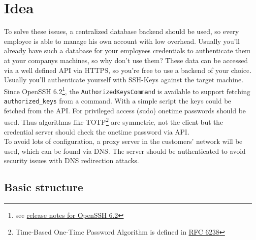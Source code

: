 %
%
%
%
%
%
%


\section{Idea}

To solve these issues, a centralized database backend should be used, so every
employee is able to manage his own account with low overhead. Usually you'll
already have such a database for your employees credentials to authenticate them
at your companys machines, so why don't use them? These data can be accessed via
a well defined API via HTTPS, so you're free to use a backend of your choice. \\

Usually you'll authenticate yourself with SSH-Keys against the target machine.
Since OpenSSH 6.2\footnote{see
\href{http://www.openssh.com/txt/release-6.2}{release notes for OpenSSH 6.2}},
the \verb+AuthorizedKeysCommand+ is available to support fetching
\verb+authorized_keys+ from a command. With a simple script the keys could be
fetched from the API. For privileged access (sudo) onetime passwords should be
used. Thus algorithms like TOTP\footnote{Time-Based One-Time Password Algorithm
is defined in \href{https://tools.ietf.org/html/rfc6238}{RFC 6238}} are
symmetric, not the client but the credential server should check the onetime
password via API. \\

To avoid lots of configuration, a proxy server in the customers' network will be
used, which can be found via DNS. The server should be authenticated to avoid
security issues with DNS redirection attacks.


\subsection{Basic structure}

